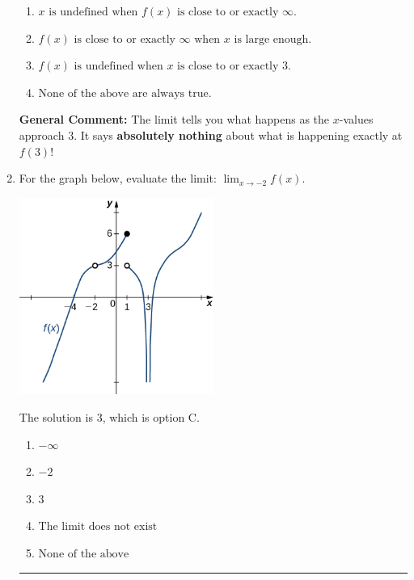 \documentclass{extbook}[14pt]
\newcommand{\litem}[1]{\item #1

\rule{\textwidth}{0.4pt}}
\begin{document}
\begin{enumerate}
{\begin{enumerate}[label=\Alph*.]
\item \( x \text{ is undefined when } f(x) \text{ is close to or exactly } \infty. \)


\item \( f(x) \text{ is close to or exactly } \infty \text{ when } x \text{ is large enough}. \)


\item \( f(x) \text{ is undefined when } x \text{ is close to or exactly } 3. \)


\item \( \text{None of the above are always true.} \)


\end{enumerate}

\textbf{General Comment:} The limit tells you what happens as the $x$-values approach $3$. It says \textbf{absolutely nothing} about what is happening exactly at $f(3)$!
}
\litem{
For the graph below, evaluate the limit: $ \displaystyle \lim_{x \rightarrow -2} f(x)$.

\begin{center}
    \includegraphics[width=0.5\textwidth]{../Figures/evaluateLimitGraphicallyC.png}
\end{center}


The solution is \( 3 \), which is option C.\begin{enumerate}[label=\Alph*.]
\item \( -\infty \)


\item \( -2 \)


\item \( 3 \)


\item \( \text{The limit does not exist} \)


\item \( \text{None of the above} \)


\end{enumerate}

}
\end{enumerate}
\end{document}

